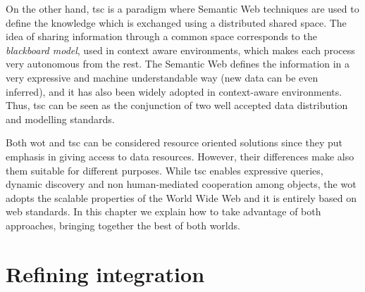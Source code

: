 On the other hand, \ac{tsc} is a paradigm where Semantic Web techniques are used to define the knowledge which is exchanged using a distributed shared space.
The idea of sharing information through a common space corresponds to the \textit{blackboard model}, used in context aware environments, which makes each process very autonomous from the rest.
The Semantic Web defines the information in a very expressive and machine understandable way (new data can be even inferred), and it has also been widely adopted in context-aware environments.
Thus, \ac{tsc} can be seen as the conjunction of two well accepted data distribution and modelling standards.

Both \ac{wot} and \ac{tsc} can be considered resource oriented solutions since they put emphasis in giving access to data resources.
However, their differences make also them suitable for different purposes.
While \ac{tsc} enables expressive queries, dynamic discovery and non human-mediated cooperation among objects, the \ac{wot} adopts the scalable properties of the World Wide Web and it is entirely based on web standards.
In this chapter we explain how to take advantage of both approaches, bringing together the best of both worlds.




\section{Refining integration} %



